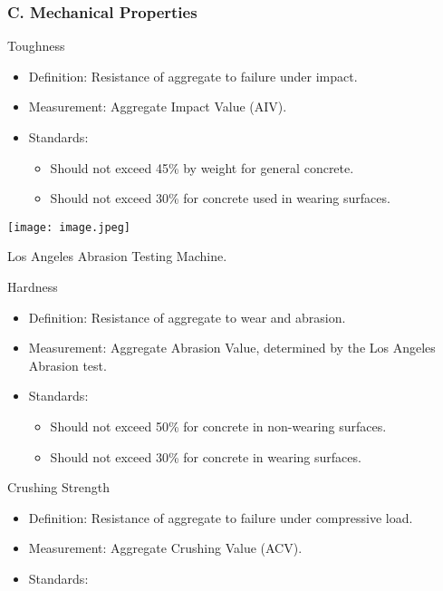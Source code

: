 \documentclass[a4paper,11pt]{book}
\begin{document}
\subsubsection{C. Mechanical Properties}
\begin{enumerate} 

\begin{minipage}{0.6\textwidth}
 \item Toughness
\begin{itemize}
    
	\item Definition: Resistance of aggregate to failure under impact.
    	\item 	Measurement: Aggregate Impact Value (AIV).
    	\item 	Standards:
    \begin{itemize}
       	 \item Should not exceed 45\% by weight for general concrete.
       	 \item Should not exceed 30\% for concrete used in wearing surfaces.
    \end{itemize}
\end{itemize}
\end{minipage}
\hfill
\begin{minipage}{0.35\textwidth}
    \centering
    \texttt{[image: image.jpeg]}
    \caption{Los Angeles Abrasion Testing Machine.}
    \label{fig:example}
\end{minipage}

 \item Hardness
\begin{itemize}
     

	\item 	Definition: Resistance of aggregate to wear and abrasion.
    	\item Measurement: Aggregate Abrasion Value, determined by the Los Angeles Abrasion test.
    	\item 	Standards:
    \begin{itemize}
        		\item Should not exceed 50\% for concrete in non-wearing surfaces.
        		\item Should not exceed 30\% for concrete in wearing surfaces.
    \end{itemize}
\end{itemize}

 \item Crushing Strength

\begin{itemize}
	\item	Definition: Resistance of aggregate to failure under compressive load.
	\item	Measurement: Aggregate Crushing Value (ACV).
	\item	Standards:
 \begin{itemize} 
 

\end{itemize}
\end{itemize}
\end{enumerate}
\end{document}

